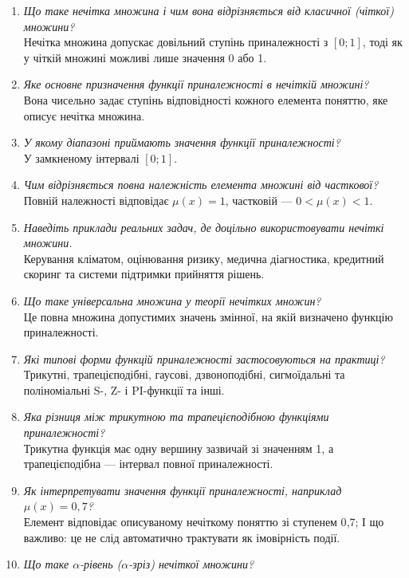 \documentclass[12pt,a4paper]{article}
\begin{document}
\begin{enumerate}[leftmargin=*,itemsep=0.35em]
  \item \textit{Що таке нечітка множина і чим вона відрізняється від класичної
    (чіткої) множини?}\\
    Нечітка множина допускає довільний ступінь приналежності з \([0;1]\),
    тоді як у чіткій множині можливі лише значення 0 або 1.
  \item \textit{Яке основне призначення функції приналежності в нечіткій множині?}\\
    Вона чисельно задає ступінь відповідності кожного елемента поняттю,
    яке описує нечітка множина.
  \item \textit{У якому діапазоні приймають значення функції приналежності?}\\
    У замкненому інтервалі \([0;1]\).
  \item \textit{Чим відрізняється повна належність елемента множині від часткової?}\\
    Повній належності відповідає \(\mu(x)=1\), частковій ---
    \(0<\mu(x)<1\).
  \item \textit{Наведіть приклади реальних задач, де доцільно використовувати нечіткі
    множини.}\\
    Керування кліматом, оцінювання ризику, медична діагностика, кредитний
    скоринг та системи підтримки прийняття рішень.
  \item \textit{Що таке універсальна множина у теорії нечітких множин?}\\
    Це повна множина допустимих значень змінної, на якій визначено функцію
    приналежності.
  \item \textit{Які типові форми функцій приналежності застосовуються на практиці?}\\
    Трикутні, трапецієподібні, гаусові, дзвоноподібні, сигмоїдальні та
    поліноміальні S-, Z- і PI-функції та інші.
  \item \textit{Яка різниця між трикутною та трапецієподібною функціями
    приналежності?}\\
    Трикутна функція має одну вершину зазвичай зі значенням 1, а
    трапецієподібна --- інтервал повної приналежності.
  \item \textit{Як інтерпретувати значення функції приналежності, наприклад
    $\mu(x)=0{,}7$?}\\
    Елемент відповідає описуваному нечіткому поняттю зі ступенем 0{,}7; І що важливо: це
    не слід автоматично трактувати як імовірність події.
  \item \textit{Що таке $\alpha$-рівень ($\alpha$-зріз) нечіткої множини?}\\

\end{enumerate}
\end{document}
